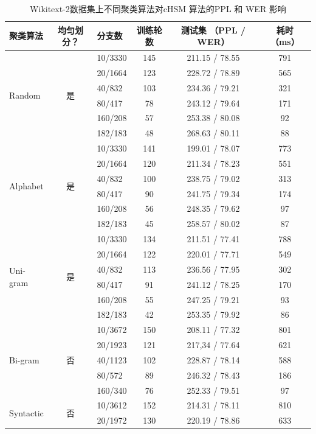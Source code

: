 \begin{table}[!ht]
  \centering
  \caption{Wikitext-2数据集上不同聚类算法对cHSM 算法的PPL 和 WER 影响\label{table:clustering}}
  \begin{tabular}{lclccc} \toprule
聚类算法 & 均匀划分？&分支数& 训练轮数& 测试集 （PPL / WER）&耗时 （ms）\\ \midrule
  \multirow{6}{*}{Random}  &\multirow{6}{*}{是}&10/3330&145&211.15 / 78.55 &791\\
    &&20/1664&123&228.72 / 78.89&565\\
    &&40/832&103&234.36 / 79.21&321\\
    &&80/417&78&243.12 / 79.64&171\\
    &&160/208 &57&253.38 / 80.08&92\\
    &&182/183&48&268.63 / 80.11&88\\
  \midrule
  \multirow{6}{*}{Alphabet}  &\multirow{6}{*}{是}&10/3330 &141&199.01 / 78.07 &773\\
    &&20/1664 &120&211.34 / 78.23&551\\
    &&40/832 &100&238.75 / 79.02&313\\
    &&80/417 &90&241.75 / 79.34&174\\
    &&160/208 &56&248.35 / 79.62&97\\
    &&182/183&45&258.57 / 80.02&87\\
  \midrule
  \multirow{6}{*}{Uni-gram}   &\multirow{6}{*}{是} &10/3330&134&211.51 / 77.41 &788\\
    & &20/1664&122&220.01 / 77.71&549\\
    & &40/832&113&236.56 / 77.95&302\\
    & &80/417&91& 241.12 / 78.25&170\\
    & &160/208&55&247.25 / 79.21&93\\
    & &182/183&42&253.35 / 79.92&86\\
  \midrule
  \multirow{5}{*}{Bi-gram}   &\multirow{5}{*}{否}&10/3672&150&208.11 / 77.32&801\\
     &&20/1923&121&217,34 / 77.64&621\\
     &&40/1123&102&228.87 / 78.14&588\\
     &&80/572&89&246.32 / 78.43&186\\
     &&160/340&76&252.33 / 79.51&97\\
  \midrule
  \multirow{5}{*}{Syntactic}  &\multirow{5}{*}{否}&10/3612 &152&214.31 / 78.11&810\\
    &&20/1972 &130&220.19 / 78.86&633\\

\end{tabular}
\end{table}
